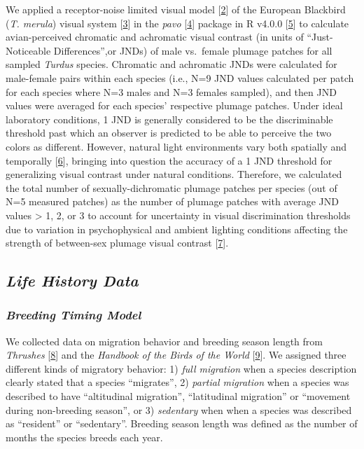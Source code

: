 \documentclass[
  a4paper,
]{article}
\begin{document}
We applied a receptor-noise limited visual model
{[}\protect\hyperlink{ref-vorobyev1998}{2}{]} of the European Blackbird
(\emph{T. merula}) visual system
{[}\protect\hyperlink{ref-hart2000}{3}{]} in the \emph{pavo}
{[}\protect\hyperlink{ref-maia2019}{4}{]}⁠ package in R v4.0.0
{[}\protect\hyperlink{ref-rcoreteam2020}{5}{]}⁠ to calculate
avian-perceived chromatic and achromatic visual contrast (in units of
``Just-Noticeable Differences'',or JNDs) of male vs.~female plumage
patches for all sampled \emph{Turdus} species. Chromatic and achromatic
JNDs were calculated for male-female pairs within each species (i.e.,
N=9 JND values calculated per patch for each species where N=3 males and
N=3 females sampled), and then JND values were averaged for each
species' respective plumage patches. Under ideal laboratory conditions,
1 JND is generally considered to be the discriminable threshold past
which an observer is predicted to be able to perceive the two colors as
different. However, natural light environments vary both spatially and
temporally {[}\protect\hyperlink{ref-endler1993}{6}{]}⁠, bringing into
question the accuracy of a 1 JND threshold for generalizing visual
contrast under natural conditions. Therefore, we calculated the total
number of sexually-dichromatic plumage patches per species (out of N=5
measured patches) as the number of plumage patches with average JND
values \textgreater{} 1, 2, or 3 to account for uncertainty in visual
discrimination thresholds due to variation in psychophysical and ambient
lighting conditions affecting the strength of between-sex plumage visual
contrast {[}\protect\hyperlink{ref-kemp2015}{7}{]}⁠.

\hypertarget{life-history-data}{%
\subsection{\texorpdfstring{\emph{Life History
Data}}{Life History Data}}\label{life-history-data}}

\hypertarget{breeding-timing-model}{%
\subsubsection{\texorpdfstring{\emph{Breeding Timing
Model}}{Breeding Timing Model}}\label{breeding-timing-model}}

We collected data on migration behavior and breeding season length from
\emph{Thrushes} {[}\protect\hyperlink{ref-clement2000}{8}{]} and the
\emph{Handbook of the Birds of the World}
{[}\protect\hyperlink{ref-delhoyo2017}{9}{]}⁠. We assigned three
different kinds of migratory behavior: 1) \emph{full migration} when a
species description clearly stated that a species ``migrates'', 2)
\emph{partial migration} when a species was described to have
``altitudinal migration'', ``latitudinal migration'' or ``movement
during non-breeding season'', or 3) \emph{sedentary} when when a species
was described as ``resident'' or ``sedentary''. Breeding season length
was defined as the number of months the species breeds each year.
\end{document}
